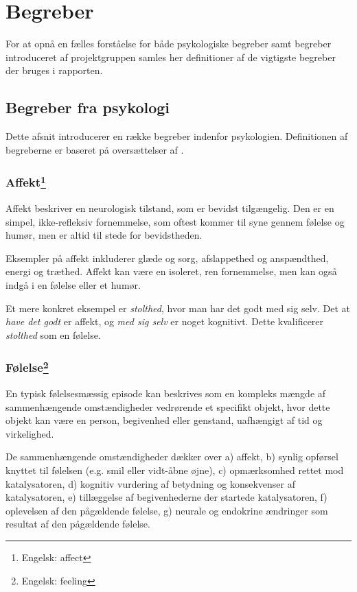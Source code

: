 \chapter{Begreber}
For at opnå en fælles forståelse for både psykologiske begreber samt begreber introduceret af projektgruppen samles her definitioner af de vigtigste begreber der bruges i rapporten.

\section{Begreber fra psykologi}
Dette afsnit introducerer en række begreber indenfor psykologien.
Definitionen af begreberne er baseret på oversættelser af \citet{ekkekakis}.

\subsection[Affekt]{Affekt\footnote{Engelsk: affect}}
Affekt beskriver en neurologisk tilstand, som er bevidst tilgængelig.
Den er en simpel, ikke-refleksiv fornemmelse, som oftest kommer til syne gennem følelse og humør, men er altid til stede for bevidstheden.

Eksempler på affekt inkluderer glæde og sorg, afslappethed og anspændthed, energi og træthed.
Affekt kan være en isoleret, ren fornemmelse, men kan også indgå i en følelse eller et humør.

Et mere konkret eksempel er \textit{stolthed}, hvor man har det godt med sig selv.
Det at \textit{have det godt} er affekt, og \textit{med sig selv} er noget kognitivt.
Dette kvalificerer \textit{stolthed} som en følelse.\cite[p. 322]{ekkekakis}

\subsection[Følelse]{Følelse\footnote{Engelsk: feeling}}
En typisk følelsesmæssig episode kan beskrives som en kompleks mængde af sammenhængende omstændigheder vedrørende et specifikt objekt, hvor dette objekt kan være en person, begivenhed eller genstand, uafhængigt af tid og virkelighed.

De sammenhængende omstændigheder dækker over a) affekt, b) synlig opførsel knyttet til følelsen (e.g. smil eller vidt-åbne øjne), c) opmærksomhed rettet mod katalysatoren, d) kognitiv vurdering af betydning og konsekvenser af katalysatoren, e) tillæggelse af begivenhederne der startede katalysatoren, f) oplevelsen af den pågældende følelse, g) neurale og endokrine ændringer som resultat af den pågældende følelse.

